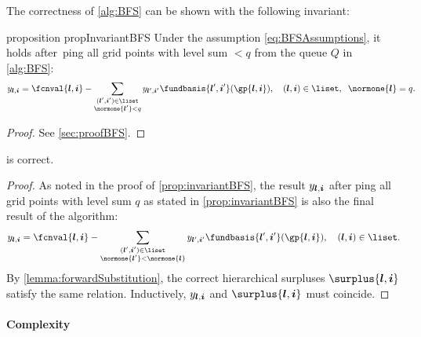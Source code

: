 The correctness of \cref{alg:BFS} can be shown with the following invariant:

\begin{restatable}{%
  proposition%
}{%
  propInvariantBFS%
}
  \label{prop:invariantBFS}
  Under the assumption \eqref{eq:BFSAssumptions},
  it holds after \pop{}\,ping all grid points with level sum $< q$
  from the queue $Q$ in \cref{alg:BFS}:
  \begin{equation}
    \label{eq:propInvariantBFS}
    \linout{\*l,\*i}
    = \fcnval{\*l,\*i} -
    \sum_{\substack{(\*l',\*i')\in\liset\\\normone{\*l'} < q}}
    \linout{\*l',\*i'} \fundbasis{\*l',\*i'}(\gp{\*l,\*i}),\quad
    (\*l, \*i) \in \liset,\;\;
    \normone{\*l} = q.
    \hspace*{-6mm}
  \end{equation}
\end{restatable}

\begin{proof}
  See \cref{sec:proofBFS}.
\end{proof}

\begin{shortcorollary}
  \label{cor:algBFSCorrectness}
   is correct.
\end{shortcorollary}

\begin{proof}
  As noted in the proof of \cref{prop:invariantBFS},
  the result $\linout{\*l,\*i}$ after \pop{}ping all grid points with level sum
  $q$ as stated in \cref{prop:invariantBFS} is also the final result
  of the algorithm:
  \begin{equation}
    \linout{\*l,\*i}
    = \fcnval{\*l,\*i} -
    \sum_{\substack{(\*l',\*i')\in\liset\\\normone{\*l'} < \normone{\*l}}}
    \linout{\*l',\*i'} \fundbasis{\*l',\*i'}(\gp{\*l,\*i}),\quad
    (\*l, \*i) \in \liset.
  \end{equation}
  By \cref{lemma:forwardSubstitution},
  the correct hierarchical surpluses $\surplus{\*l,\*i}$
  satisfy the same relation.
  Inductively, $\linout{\*l,\*i}$ and $\surplus{\*l,\*i}$ must coincide.
\end{proof}

\paragraph{Complexity}

